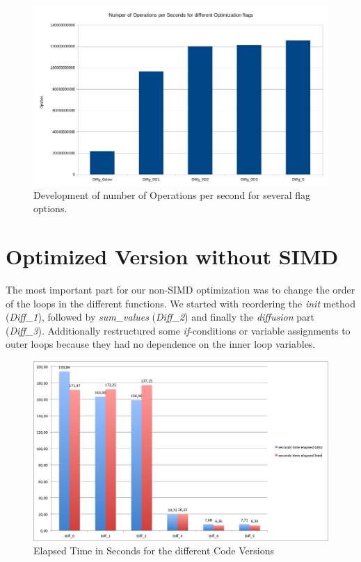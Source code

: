 \documentclass[12pt,a4paper]{article}
\begin{document}
\begin{figure}
	\centering
	\includegraphics[width=1.0\linewidth]{"Benchmark 3/noopssec"}
	\caption{Development of number of Operations per second for several flag options.  }
	\label{fig:noopssec}
\end{figure}

\section{Optimized Version without SIMD}\label{chp:optwosimd}

The most important part for our non-SIMD optimization was to change the order of the loops in the different functions. We started with reordering the \emph{init} method (\emph{Diff\_1}), followed by \emph{sum\_values} (\emph{Diff\_2}) and finally the \emph{diffusion} part (\emph{Diff\_3}). Additionally restructured some \emph{if}-conditions or variable assignments to outer loops because they had no dependence on the inner loop variables.  

 
\begin{figure}
	\centering
	\includegraphics[width=1.0\linewidth]{"Benchmark/seconds"}
	\caption{Elapsed Time in Seconds for the different Code Versions}
	\label{fig:seconds}
\end{figure}
\end{document}
